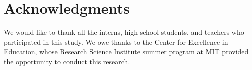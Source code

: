 \documentclass{sigchi}
\begin{document}












\section{Acknowledgments}
We would like to thank all the interns, high school students, and teachers who participated in this study.
We owe thanks to the Center for Excellence in Education, whose Research Science Institute summer program at MIT provided the opportunity to conduct this research.

%
%
%
%
%
\balance{}



\end{document}
